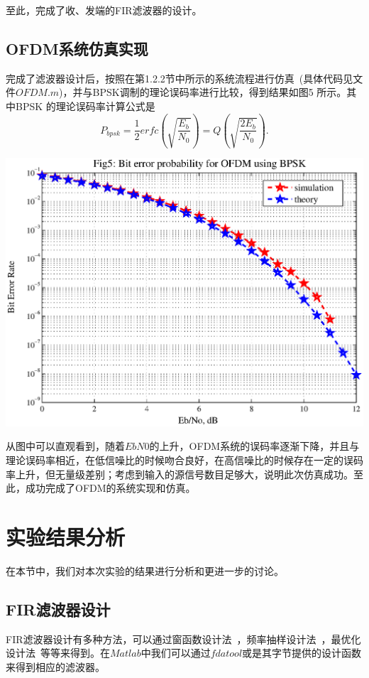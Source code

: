 \documentclass[a4paper,11pt,onecolumn,twoside]{article}
\begin{document}
至此，完成了收、发端的FIR滤波器的设计。

\subsection{OFDM系统仿真实现}
完成了滤波器设计后，按照在第1.2.2节中所示的系统流程进行仿真~(具体代码见文件$OFDM.m$)，并与BPSK调制的理论误码率进行比较，得到结果如图5 所示。其中BPSK 的理论误码率计算公式是
\begin{equation}
P_{bpsk} = \frac{1}{2} erfc(\sqrt{\frac{E_b}{N_0}})= Q(\sqrt{\frac{2E_b}{N_0}}).
\end{equation}

\begin{center}
    \includegraphics[width=1\textwidth]{fig5.eps}
\end{center}

从图中可以直观看到，随着$EbN0$的上升，OFDM系统的误码率逐渐下降，并且与理论误码率相近，在低信噪比的时候吻合良好，在高信噪比的时候存在一定的误码率上升，但无量级差别；考虑到输入的源信号数目足够大，说明此次仿真成功。至此，成功完成了OFDM的系统实现和仿真。

\vspace{0.2cm}
\section{实验结果分析}
在本节中，我们对本次实验的结果进行分析和更进一步的讨论。

\subsection{FIR滤波器设计}
FIR滤波器设计有多种方法，可以通过窗函数设计法~\supercite{course2}，频率抽样设计法~\supercite{course3}，最优化设计法~\supercite{course5}等等来得到。在$Matlab$中我们可以通过$fdatool$或是其字节提供的设计函数来得到相应的滤波器。
\end{document}
